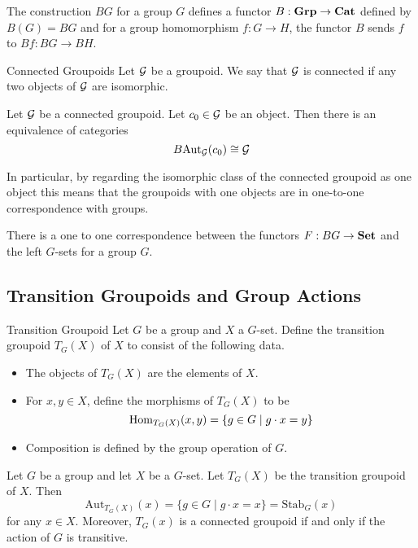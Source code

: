 \documentclass[a4paper]{article}
\begin{document}
\begin{prp}{}{} The construction $BG$ for a group $G$ defines a functor $B:\bold{Grp}\to\bold{Cat}$ defined by $B(G)=BG$ and for a group homomorphism $f:G\to H$, the functor $B$ sends $f$ to $Bf:BG\to BH$. 
\end{prp}

\begin{defn}{Connected Groupoids}{} Let $\mathcal{G}$ be a groupoid. We say that $\mathcal{G}$ is connected if any two objects of $\mathcal{G}$ are isomorphic. 
\end{defn}

\begin{prp}{}{} Let $\mathcal{G}$ be a connected groupoid. Let $c_0\in\mathcal{G}$ be an object. Then there is an equivalence of categories $$B\text{Aut}_{\mathcal{G}}(c_0)\cong\mathcal{G}$$
\end{prp}

In particular, by regarding the isomorphic class of the connected groupoid as one object this means that the groupoids with one objects are in one-to-one correspondence with groups. 

\begin{thm}{}{} There is a one to one correspondence between the functors $F:BG\to\bold{Set}$ and the left $G$-sets for a group $G$. 
\end{thm}

\subsection{Transition Groupoids and Group Actions}
\begin{defn}{Transition Groupoid}{} Let $G$ be a group and $X$ a $G$-set. Define the transition groupoid $T_G(X)$ of $X$ to consist of the following data. 
\begin{itemize}
\item The objects of $T_G(X)$ are the elements of $X$. 
\item For $x,y\in X$, define the morphisms of $T_G(X)$ to be $$\operatorname{Hom}_{T_G(X)}(x,y)=\{g\in G\;|\;g\cdot x=y\}$$
\item Composition is defined by the group operation of $G$. 
\end{itemize}
\end{defn}

\begin{lmm}{}{} Let $G$ be a group and let $X$ be a $G$-set. Let $T_G(X)$ be the transition groupoid of $X$. Then $$\text{Aut}_{T_G(X)}(x)=\{g\in G\;|\;g\cdot x=x\}=\text{Stab}_G(x)$$ for any $x\in X$. Moreover, $T_G(x)$ is a connected groupoid if and only if the action of $G$ is transitive. 
\end{lmm}
\end{document}
